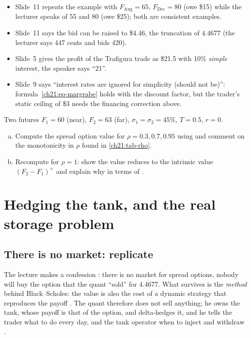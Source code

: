 \begin{paracol}{2}
\begin{coursenote}
\begin{itemize}
  \item Slide~11 repeats the example with $F_{\mathrm{Aug}}=65$, $F_{\mathrm{Dec}}=80$ (owe \$15) while the lecturer speaks of 55 and 80 (owe \$25); both are consistent examples.
  \item Slide~11 says the bid can be raised to \$4.46, the truncation of $4.4677$ (the lecturer says 447 cents and bids
      420).
  \item Slide~5 gives the profit of the Trafigura trade as \$21.5 with 10\% \emph{simple} interest, the speaker says ``21''.
  \item Slide~9 says ``interest rates are ignored for simplicity (should not be)'': formula~\eqref{ch21:eq-margrabe} holds with the discount factor, but the trader's static ceiling of \$3
      needs the financing correction above.
\end{itemize}
\end{coursenote}

\begin{exercise}\label{ch21:ex-margrabe-num}
Two futures $F_1=60$ (near), $F_2=63$ (far), $\sigma_1=\sigma_2=45\%$, $T=0.5$, $r=0$.
\begin{enumerate}[(a)]
  \item Compute the spread option value for $\rho=0.3,0.7,0.95$ using
       and comment on the monotonicity in $\rho$ found in \cref{ch21:tab-rho}.
  \item Recompute for $\rho=1$: show the value reduces to the intrinsic
      value $(F_2-F_1)^+$ and explain why in terms of .
\end{enumerate}
\end{exercise}

\section{Hedging the tank, and the real storage problem}\label{ch21:sec-storage}

\subsection{There is no market: replicate}\label{ch21:sec-hedge}
The lecture makes a confession : there is no market for spread options, nobody will buy the option that the quant ``sold'' for 4.4677. What survives is the
\emph{method} behind Black--Scholes: the value is also the cost of a dynamic strategy that reproduces the payoff . The quant therefore does not sell anything; he owns the tank,
whose payoff is that of the option, and delta-hedges it, and he tells the trader what to do every day, and the tank operator when to inject and withdraw .


\end{paracol}
